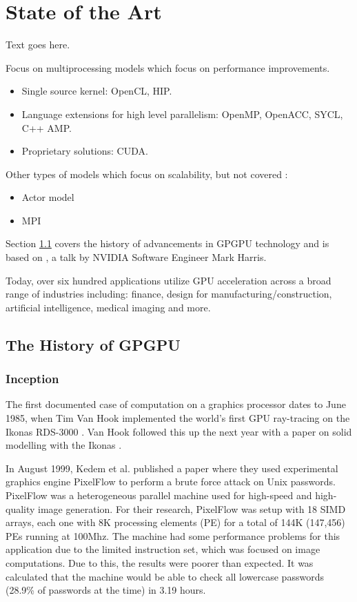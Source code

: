 \chapter{State of the Art}

Text goes here.

Focus on multiprocessing models which focus on performance improvements.

\begin{itemize}
    \item Single source kernel: OpenCL, HIP.
    \item Language extensions for high level parallelism: OpenMP, OpenACC, SYCL, C++ AMP.
    \item Proprietary solutions: CUDA.
\end{itemize}

Other types of models which focus on scalability, but not covered \cite{survey_programming_models}:

\begin{itemize}
    \item Actor model
    \item MPI
\end{itemize}

Section \ref{sect:history-gpgpu} covers the history of advancements in GPGPU technology and is based on \cite{brief_history_gpgpu}, a talk by NVIDIA Software Engineer Mark Harris. 

Today, over six hundred applications utilize GPU acceleration across a broad range of industries including: finance, design for manufacturing/construction, artificial intelligence, medical imaging and more.

\section{The History of GPGPU} \label{sect:history-gpgpu}

\subsection{Inception}
The first documented case of computation on a graphics processor dates to June 1985, when Tim Van Hook implemented the world's first GPU ray-tracing on the Ikonas RDS-3000 \cite{ikonas}. Van Hook followed this up the next year with a paper on solid modelling with the Ikonas \cite{solid_modeling_ikonas}.

In August 1999, Kedem et al. \cite{unix_passwords_gpgpu} published a paper where they used experimental graphics engine PixelFlow to perform a brute force attack on Unix passwords. PixelFlow was a heterogeneous parallel machine used for high-speed and high-quality image generation. For their research, PixelFlow was setup with 18 SIMD arrays, each one with 8K processing elements (PE) for a total of 144K (147,456) PEs running at 100Mhz. The machine had some performance problems for this application due to the limited instruction set, which was focused on image computations. Due to this, the results were poorer than expected. It was calculated that the machine would be able to check all lowercase passwords (28.9\% of passwords at the time) in 3.19 hours.

